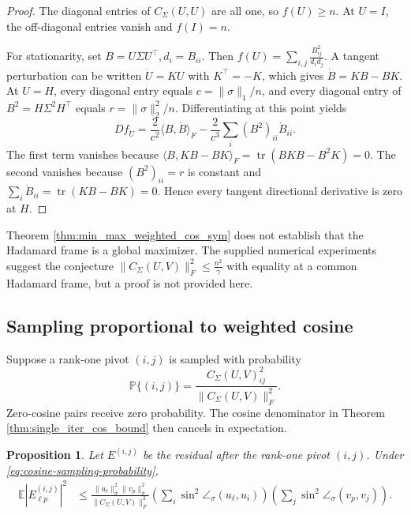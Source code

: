 \documentclass[11pt, preprint]{article}
\newtheorem{prop}[theorem]{Proposition}
\newcommand{\inner}[1]{\langle #1\rangle}
\newcommand{\prob}{\mathbb{P}}
\newcommand{\Exp}{\mathbb{E}}
\begin{document}
\begin{proof}
The diagonal entries of $C_\Sigma(U,U)$ are all one, so $f(U)\geq n$. At $U=I$, the off-diagonal entries vanish and $f(I)=n$.

For stationarity, set
\(
B=U\Sigma U^\top,
 d_i=B_{ii}.
\) 
Then
\(
f(U)=\sum_{i,j}\frac{B_{ij}^2}{d_id_j}.
\)
A tangent perturbation can be written $\dot U=KU$ with $K^\top=-K$, which gives
$\dot B=KB-BK$. At $U=H$, every diagonal entry equals
$c=\|\sigma\|_1/n$, and every diagonal entry of $B^2=H\Sigma^2H^\top$ equals
$r=\|\sigma\|_2^2/n$. Differentiating at this point yields
\[
Df_{\dot U}
=
\frac{2}{c^2}\inner{B,\dot B}_F
-
\frac{2}{c^3}\sum_i(B^2)_{ii}\dot B_{ii}.
\]
The first term vanishes because
\(\inner{B,KB-BK}_F=\operatorname{tr}(BKB-B^2K)=0. \)
The second vanishes because $(B^2)_{ii}=r$ is constant and $\sum_i\dot B_{ii}=\operatorname{tr}(KB-BK)=0$. Hence every tangent directional derivative is zero at $H$.
\end{proof}

Theorem \ref{thm:min_max_weighted_cos_sym} does not establish that the Hadamard frame is a global maximizer. The supplied numerical experiments suggest the conjecture
\(
\|C_\Sigma(U,V)\|_F^2
\leq
\frac{n^2}{\gamma}
\)
with equality at a common Hadamard frame, but a proof is not provided here.

\subsection{Sampling proportional to weighted cosine}

Suppose a rank-one pivot $(i,j)$ is sampled with probability
\begin{equation}\label{eq:cosine-sampling-probability}
\prob\{(i,j)\}
=
\frac{C_\Sigma(U,V)_{ij}^2}
{\|C_\Sigma(U,V)\|_F^2}.
\end{equation}
Zero-cosine pairs receive zero probability. The cosine denominator in Theorem \ref{thm:single_iter_cos_bound} then cancels in expectation.

\begin{prop}\label{prop:cosine-sampling-entry}
Let $E^{(i,j)}$ be the residual after the rank-one pivot $(i,j)$. Under
\eqref{eq:cosine-sampling-probability},
\begin{align*}
\Exp\left|E^{(i,j)}_{\ell p}\right|^2
&\leq
\frac{\|u_\ell\|_\sigma^2\|v_p\|_\sigma^2}
{\|C_\Sigma(U,V)\|_F^2}
\left(\sum_i\sin^2\angle_\sigma(u_\ell,u_i)\right)
\left(\sum_j\sin^2\angle_\sigma(v_p,v_j)\right).
\end{align*}
\end{prop}
\end{document}
